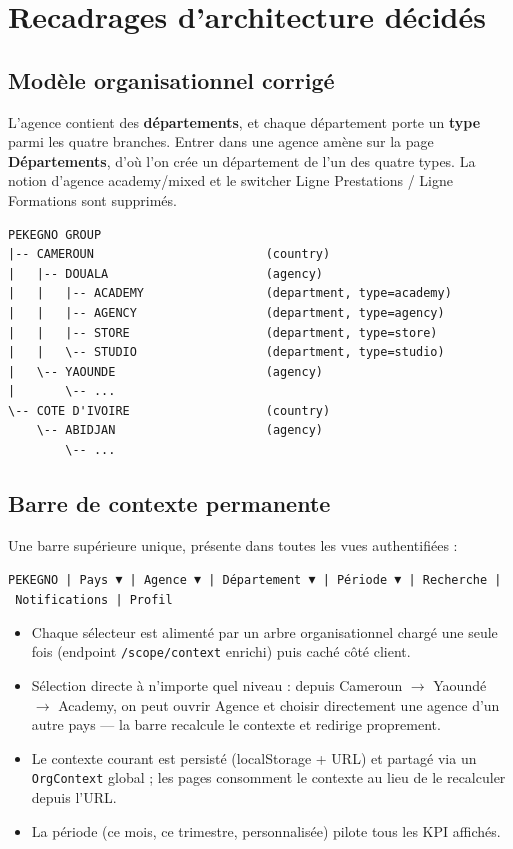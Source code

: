 \documentclass[11pt,a4paper]{article}
\begin{document}
\section{Recadrages d'architecture décidés}

\subsection{Modèle organisationnel corrigé}

L'agence contient des \textbf{départements}, et chaque département porte un \textbf{type} parmi les quatre branches. Entrer dans une agence amène sur la page \textbf{Départements}, d'où l'on crée un département de l'un des quatre types. La notion d'\og agence academy/mixed \fg{} et le switcher \og Ligne Prestations / Ligne Formations \fg{} sont supprimés.

\begin{verbatim}
PEKEGNO GROUP
|-- CAMEROUN                        (country)
|   |-- DOUALA                      (agency)
|   |   |-- ACADEMY                 (department, type=academy)
|   |   |-- AGENCY                  (department, type=agency)
|   |   |-- STORE                   (department, type=store)
|   |   \-- STUDIO                  (department, type=studio)
|   \-- YAOUNDE                     (agency)
|       \-- ...
\-- COTE D'IVOIRE                   (country)
    \-- ABIDJAN                     (agency)
        \-- ...
\end{verbatim}

\subsection{Barre de contexte permanente}

Une barre supérieure unique, présente dans toutes les vues authentifiées :

\begin{center}
\texttt{PEKEGNO~|~Pays~$\blacktriangledown$~|~Agence~$\blacktriangledown$~|~Département~$\blacktriangledown$~|~Période~$\blacktriangledown$~|~Recherche~|~Notifications~|~Profil}
\end{center}

\begin{itemize}[nosep]
  \item Chaque sélecteur est alimenté par un arbre organisationnel chargé une seule fois (endpoint \texttt{/scope/context} enrichi) puis caché côté client.
  \item Sélection directe à n'importe quel niveau : depuis Cameroun $\rightarrow$ Yaoundé $\rightarrow$ Academy, on peut ouvrir \og Agence \fg{} et choisir directement une agence d'un autre pays — la barre recalcule le contexte et redirige proprement.
  \item Le contexte courant est persisté (localStorage + URL) et partagé via un \texttt{OrgContext} global ; les pages consomment le contexte au lieu de le recalculer depuis l'URL.
  \item La période (ce mois, ce trimestre, personnalisée) pilote tous les KPI affichés.
\end{itemize}
\end{document}
